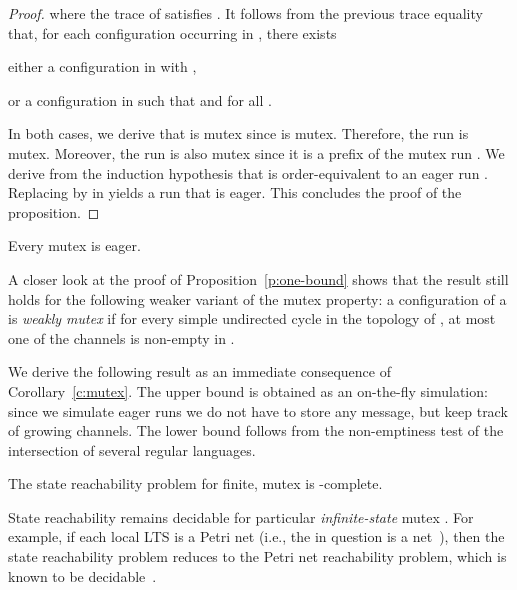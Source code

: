 \documentclass{LMCS}
\newenvironment{proposition}{\begin{prop}}{\end{prop}}
\newenvironment{remark}{\begin{rem}}{\end{rem}}
\newenvironment{corollary}{\begin{cor}}{\end{cor}}
\begin{document}
\begin{proof}
  where the trace
  of  satisfies
  .
  It follows from the previous trace equality that, for each configuration
   occurring in , there exists
  \begin{iteMize}{}
  \item
    either a configuration  in  with
    ,
  \item
    or a configuration  in  such that
     and  for all .
  \end{iteMize}
  In both cases, we derive that  is mutex since
   is mutex.
  Therefore, the run  is mutex.
  Moreover, the run  is also mutex since it is a prefix of the mutex
  run .
  We derive from the induction hypothesis that  is
  order-equivalent to an eager run .
  Replacing  by  in  yields a run
   that is eager.
  This concludes the proof of the proposition.
\end{proof}

\begin{corollary} \label{c:mutex}
  Every mutex \qcp is eager.
\end{corollary}

\begin{remark}
  A closer look at the proof of Proposition~\ref{p:one-bound} shows
  that the result still
  holds for the following weaker variant of the mutex property:
  a configuration  of a \qcp  is \emph{weakly mutex} if for
  every simple undirected cycle  in the
  topology of , at most one of the channels  is
  non-empty in .
\end{remark}

We derive the following result as an immediate consequence of
Corollary~\ref{c:mutex}. The upper bound is obtained as an on-the-fly
simulation: since we simulate eager runs we do not have to store any
message, but  keep track of growing
channels. The lower bound follows from
the non-emptiness test of the intersection of several regular languages.

\begin{proposition} \label{thm:mutextoeager}
  The state reachability problem for finite, mutex \qcp
  is \pspace-complete.
\end{proposition}

\begin{remark}
  State reachability remains decidable for particular
  \emph{infinite-state} mutex \qcp. For example, if each local
  LTS  is a Petri net (i.e., the \qcp in question
  is a \fifo net~\cite{finkel-a-1987-106-a}), then the state
  reachability problem reduces to the Petri net reachability
  problem, which is known to be
  decidable~\cite{mayr-e-1984-441-a,kosaraju-s-1982-267-a}.
  \label{rem:qcp_local_dec}
\end{remark}
\end{document}
